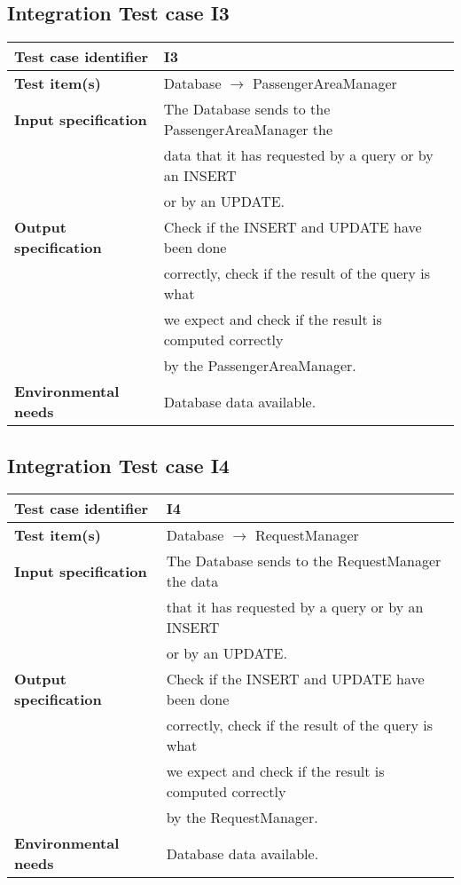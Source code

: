 	\subsection{Integration Test case I3}
		\begin{tabular}{ l l}
			\hline 		\textbf{Test case identifier} & I3 \\
			\hline		\textbf{Test item(s)}  & Database $\rightarrow$ PassengerAreaManager \\
			\hline		\textbf{Input specification} & The Database sends to the PassengerAreaManager the\\ & data that it has requested by a query or by an INSERT \\ & or by an UPDATE.\\
			\hline		\textbf{Output specification} & Check if the INSERT and UPDATE have been done\\ & correctly, check if the result of the query is what\\ &  we expect and check if the result is computed correctly\\ & by the PassengerAreaManager.\\
			\hline		\textbf{Environmental needs} &  Database data available.\\
			\hline
		\end{tabular}
	\subsection{Integration Test case I4}
		\begin{tabular}{ l l}
			\hline 		\textbf{Test case identifier} & I4 \\
			\hline		\textbf{Test item(s)}  & Database $\rightarrow$ RequestManager \\
			\hline		\textbf{Input specification} & The Database sends to the RequestManager the data\\ & that it has requested by a query or by an INSERT \\ & or by an UPDATE.\\
			\hline		\textbf{Output specification} &  Check if the INSERT and UPDATE have been done\\ & correctly, check if the result of the query is what\\ &  we expect and check if the result is computed correctly\\ & by the RequestManager.\\
			\hline		\textbf{Environmental needs} & Database data available.\\
			\hline
		\end{tabular}
